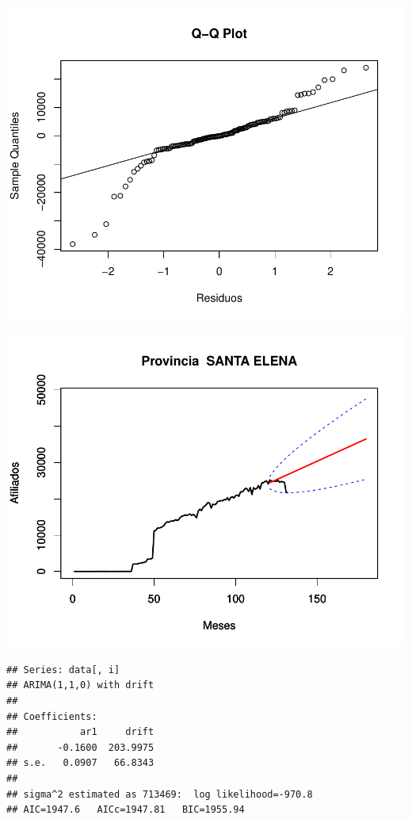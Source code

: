 \documentclass[11pt,a4paper,oneside]{article}\usepackage[]{graphicx}\usepackage[]{color}
\makeatletter
\def\maxwidth{ %
  \ifdim\Gin@nat@width>\linewidth
    \linewidth
  \else
    \Gin@nat@width
  \fi
}
\newenvironment{kframe}{%
 \def\at@end@of@kframe{}%
 \ifinner\ifhmode%
  \def\at@end@of@kframe{\end{minipage}}%
  \begin{minipage}{\columnwidth}%
 \fi\fi%
 \def\FrameCommand##1{\hskip\@totalleftmargin \hskip-\fboxsep
 \colorbox{shadecolor}{##1}\hskip-\fboxsep
     \hskip-\linewidth \hskip-\@totalleftmargin \hskip\columnwidth}%
 \MakeFramed {\advance\hsize-\width
   \@totalleftmargin\z@ \linewidth\hsize
   \@setminipage}}%
 {\par\unskip\endMakeFramed%
 \at@end@of@kframe}
\newenvironment{knitrout}{}{} %
\makeatother
\begin{document}
\begin{knitrout}
{}




{\centering \includegraphics[width=\maxwidth]{figure/unnamed-chunk-16-57} 

}




{\centering \includegraphics[width=\maxwidth]{figure/unnamed-chunk-16-58} 

}


\begin{kframe}\begin{verbatim}
## Series: data[, i] 
## ARIMA(1,1,0) with drift         
## 
## Coefficients:
##           ar1     drift
##       -0.1600  203.9975
## s.e.   0.0907   66.8343
## 
## sigma^2 estimated as 713469:  log likelihood=-970.8
## AIC=1947.6   AICc=1947.81   BIC=1955.94
\end{verbatim}
\end{kframe}


\end{knitrout}
\end{document}
